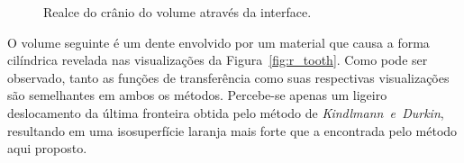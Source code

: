 \begin{figure}[h]
	\centering
	\caption{Realce do crânio do volume  através da interface.}
	\label{fig:r_cthead_iso}
\end{figure}


	O volume seguinte é um dente envolvido por um material que causa a forma cilíndrica revelada nas visualizações da Figura~\ref{fig:r_tooth}. Como pode ser observado, tanto as funções de transferência como suas respectivas visualizações são semelhantes em ambos os métodos. Percebe-se apenas um ligeiro deslocamento da última fronteira obtida pelo método de \textit{Kindlmann~e~Durkin}, resultando em uma isosuperfície laranja mais forte que a encontrada pelo método aqui proposto.
	

